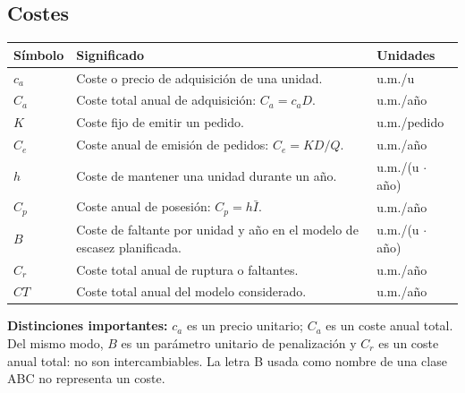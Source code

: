 \documentclass[11pt,a4paper]{article}
\begin{document}
\subsection{Costes}
\begin{longtable}{@{}p{2cm}p{8cm}p{3.5cm}@{}}
    \toprule
    Símbolo & Significado                                                             & Unidades             \\
    \midrule
    \endhead
    $c_a$   & Coste o precio de adquisición de una unidad.                            & u.m./u               \\
    $C_a$   & Coste total anual de adquisición: $C_a=c_a D$.                          & u.m./año             \\
    $K$     & Coste fijo de emitir un pedido.                                         & u.m./pedido          \\
    $C_e$   & Coste anual de emisión de pedidos: $C_e=KD/Q$.                          & u.m./año             \\
    $h$     & Coste de mantener una unidad durante un año.                            & u.m./(u $\cdot$ año) \\
    $C_p$   & Coste anual de posesión: $C_p=h\bar{I}$.                                & u.m./año             \\
    $B$     & Coste de faltante por unidad y año en el modelo de escasez planificada. & u.m./(u $\cdot$ año) \\
    $C_r$   & Coste total anual de ruptura o faltantes.                               & u.m./año             \\
    $CT$    & Coste total anual del modelo considerado.                               & u.m./año             \\
    \bottomrule
\end{longtable}
\textbf{Distinciones importantes:} $c_a$ es un precio unitario; $C_a$ es un coste anual total. Del mismo modo, $B$ es un parámetro unitario de penalización y $C_r$ es un coste anual total: no son intercambiables. La letra B usada como nombre de una clase ABC no representa un coste.
\end{document}
